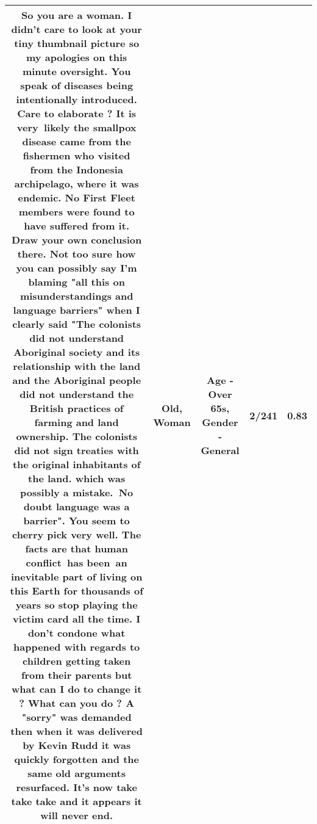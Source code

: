\documentclass[11pt]{article}
\newlength\mylength
\begin{document}
\begin{center}
\begin{longtable}{|C{.65\mylength}|C{.30\mylength}|C{.12\mylength}|C{.12\mylength}|C{.12\mylength}|}
  \small So you are a \textbf{woman}. I didn't care to look at your tiny thumbnail picture so my apologies on this minute oversight. You speak of diseases being intentionally introduced. Care to elaborate ? It is very likely the smallpox disease came from the fishermen who visited from the Indonesia archipelago, where it was endemic. No First Fleet members were found to have suffered from it. Draw your own conclusion there. Not too sure how you can possibly say I'm blaming "all this on misunderstandings and language barriers" when I clearly said "The colonists did not understand Aboriginal society and its relationship with the land and the Aboriginal people did not understand the British practices of farming and land ownership. The colonists did not sign treaties with the original inhabitants of the land. which was possibly a mistake. No doubt language was a barrier". You seem to cherry pick very well. The facts are that human conflict has been an inevitable part of living on this Earth for thousands of years so stop playing the victim card all the time. I don't condone what happened with regards to children getting taken from their parents but what can I do to change it ? What can you do ? A "sorry" was demanded then when it was delivered by Kevin Rudd it was quickly forgotten and the same \textbf{old} arguments resurfaced. It's now take take take and it appears it will never end.\normalsize   & Old, Woman & Age - Over 65s, Gender - General & 2/241 & 0.83 \\  \hline

\end{longtable}
\end{center}
\end{document}
